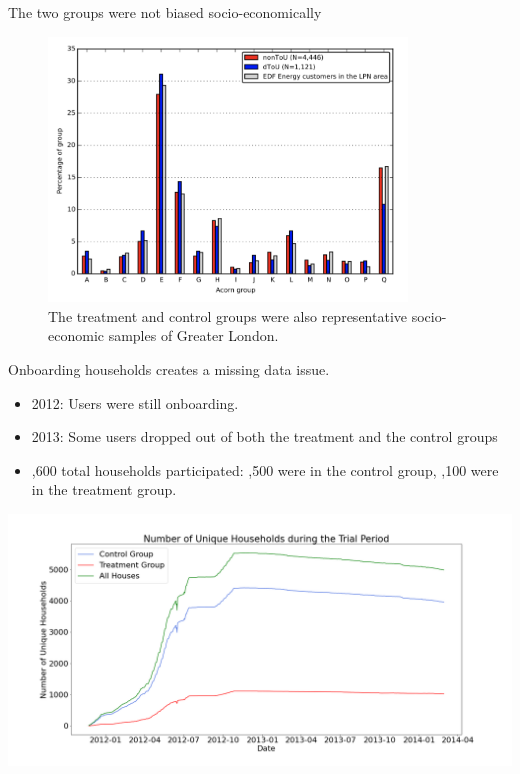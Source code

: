 \documentclass{beamer}
\begin{document}
\begin{frame}{The two groups were not biased socio-economically}
  \begin{figure}
    \centering
    \includegraphics[width=0.85\textwidth]{images/london-socio-breakdown.png}
    \caption{The treatment and control groups were also representative socio-economic samples of Greater London.}
  \end{figure}
\end{frame}

\begin{frame}{Onboarding households creates a missing data issue.}
  \begin{itemize}
    \item 2012: Users were still onboarding.
    \item 2013: Some users dropped out of both the treatment and the control groups
    \item {},600 total households participated: ,500 were in the control group, ,100 were in the treatment group.
  \end{itemize}
  \vspace{-0.25cm}
  \includegraphics[width=1\textwidth]{images/house-count.png}
\end{frame}
\end{document}

